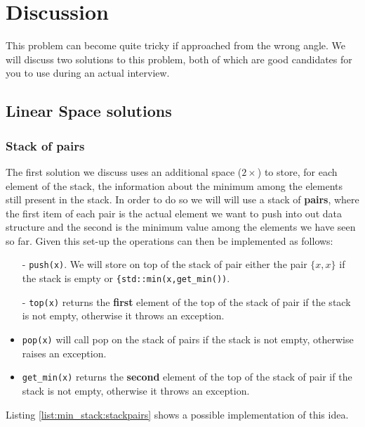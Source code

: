 \section{Discussion}
\label{min_stack:sec:discussion}
This problem can become quite tricky if approached from the wrong angle. We will discuss two solutions to this problem, both of which are good candidates for you to use during an actual interview. 

\subsection{Linear Space solutions}
\label{min_stack:sec:double_stack}

\subsubsection{Stack of pairs}
\label{min_stack:sec:stackpairs}
The first solution we discuss uses an additional space ($2\times$) to store, for each element of the stack, the information about the minimum among the elements still present in the stack. In order to do so we will will use a stack of \textbf{pairs}, where the first item of each pair is the actual element we want to push into out data structure and the second is the minimum value among the elements we have seen so far. Given this set-up the operations can then be implemented as follows:

\begin{itemize}
	\item[-]\lstinline[columns=fixed]{push(x)}. We will store on top of the stack of pair either the pair $\{x,x\}$ if the stack is empty or \lstinline[columns=fixed]{{std::min(x,get_min())}.
	\item[-]\lstinline[columns=fixed]{top(x)}  returns the \textbf{first} element of the top of the stack of pair if the stack is not empty, otherwise it throws an exception.
	\item[-]\lstinline[columns=fixed]{pop(x)} will call pop on the stack of pairs if the stack is not empty, otherwise raises an exception.
	\item[-]\lstinline[columns=fixed]{get_min(x)}  returns the \textbf{second} element of the top of the stack of pair if the stack is not empty, otherwise it throws an exception.
\end{itemize}

Listing \ref{list:min_stack:stackpairs} shows a possible implementation of this idea.


